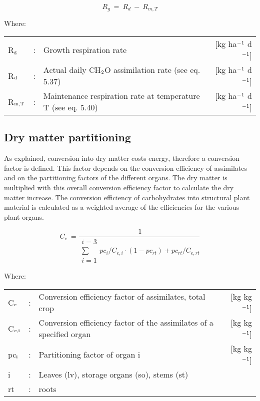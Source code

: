 \begin{equation}
R _{g} ~=~ R _{d} ~-~ R _{m,T} 
\end{equation}

Where:\\[5pt]
\begin{tabularx}{\textwidth}{llXr}
R$_{{\rm g}}$ &:& Growth respiration rate   &     [kg ha$^{{\rm -1}}$ d$^{{\rm -1}}$]\\
R$_{{\rm d}}$ &:& Actual daily CH$_{{\rm 2}}$O assimilation rate (see eq. 5.37)   &   
    [kg ha$^{{\rm -1}}$ d$^{{\rm -1}}$]\\
R$_{{\rm m,T}}$ &:& Maintenance respiration rate at 
    temperature T (see eq. 5.40)   &     [kg ha$^{{\rm -1}}$ d$^{{\rm -1}}$]\\
\end{tabularx}

\subsection{Dry matter partitioning  }

As explained, conver\-sion into dry matter costs energy, therefore a conversion factor is
defined. This factor depends on the conversion efficiency of assimi\-lates and on the
partition\-ing factors of the different organs. The dry matter is multiplied with this overall
conver\-sion efficiency factor to calculate the dry matter increase. The conver\-sion 
efficiency of carbohydrates into structural plant material is calculated as a weighted average
of the efficiencies for the various plant organs.

\begin{equation}
C _{e} ~={\frac{~1}{
        \begin{array}{c}
        {i=3}  \\
        \sum  \\
        {i=1}
        \end{array} {pc_{i}}/{C_{e,i}} \cdot (1-pc_{rt} ) + {pc_{rt}}/{C_{e,rt}} 
        }}
\end{equation}

Where:\\[5pt]
\begin{tabularx}{\textwidth}{llXr}
C$_{{\rm e}}$ &:& Conversion efficiency factor of assimilates, total crop  &   
    [kg kg$^{{\rm -1}}$]\\
C$_{{\rm e,i}}$ &:& Conversion efficiency factor of the assimilates 
    of a specified organ  &      [kg kg$^{{\rm -1}}$]\\
pc$_{{\rm i}}$ &:& Partitioning factor of organ i   &
     [kg kg$^{{\rm -1}}$]\\
i &:& Leaves (lv), storage organs (so), stems (st)\\
rt &:& roots\\
\end{tabularx}

